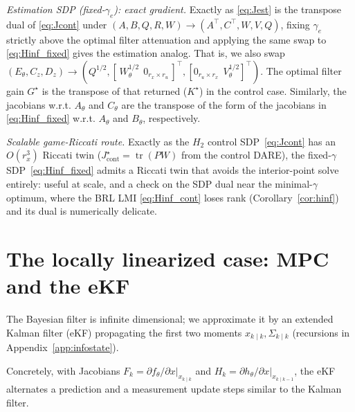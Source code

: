\documentclass[twocolumn,amsthm]{autart}
\begin{document}
\emph{Estimation SDP (fixed-$\gamma_e$): exact gradient.} Exactly as
\eqref{eq:Jest} is the transpose dual of \eqref{eq:Jcont} under
$(A,B,Q,R,W)\to(A^\top,C^\top,W,V,Q)$, fixing $\gamma_e$ strictly above the
optimal filter attenuation and applying the same swap to \eqref{eq:Hinf_fixed}
gives the estimation analog. That is, we also swap $(E_\theta, C_z, D_z) \to (Q^{1/2}, [\,W_\theta^{1/2}\;\,0_{r_x \times r_u}\,]^\top, [0_{r_u \times r_x}\;\,V_\theta^{1/2}]^\top)$. The optimal filter gain $G^\star$ is the transpose of that returned ($K^\star$) in the control case. Similarly, the jacobians w.r.t. $A_\theta$ and $C_\theta$ are the transpose of the form of the jacobians in \eqref{eq:Hinf_fixed} w.r.t. $A_\theta$ and $B_\theta$, respectively.

\emph{Scalable game-Riccati route.} Exactly as the $H_2$ control SDP~\eqref{eq:Jcont}
has an $O(r_x^3)$ Riccati twin ($J_{\mathrm{cont}}^\star=\operatorname{tr}(PW)$ from the
control DARE), the fixed-$\gamma$ SDP~\eqref{eq:Hinf_fixed} admits a Riccati twin that
avoids the interior-point solve entirely: useful at scale, and a check on the SDP
dual near the minimal-$\gamma$ optimum, where the BRL LMI \eqref{eq:Hinf_cont}
loses rank (Corollary~\ref{cor:hinf}) and its dual is numerically delicate.

\section{The locally linearized case: MPC and the eKF}\label{sec:ekf}

The Bayesian filter is infinite dimensional; we approximate it by an extended Kalman
filter (eKF) \cite{anderson2012optimal,ramadan2024extended} propagating the first
two moments $x_{k\mid k},\Sigma_{k\mid k}$ (recursions in
Appendix~\ref{app:infostate}).

Concretely, with Jacobians $F_k = \partial f_\theta/\partial x|_{x_{k\mid k}}$ and
$H_k = \partial h_\theta/\partial x|_{x_{k\mid k-1}}$, the eKF alternates a
prediction and a measurement update steps similar to the Kalman filter.
\end{document}
